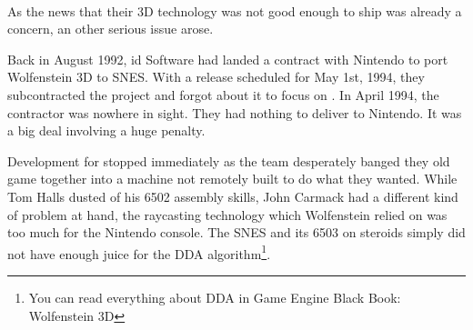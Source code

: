 \\
\par
{}%
\label{HUD_screenshot}
\par
As the news that their 3D technology was not good enough to ship was already a concern, an other serious issue arose.\\
\par
Back in August 1992, id Software had landed a contract with Nintendo to port Wolfenstein 3D to SNES. With a release scheduled for May 1st, 1994, they subcontracted the project and forgot about it to focus on \doom. In April 1994, the contractor was nowhere in sight. They had nothing to deliver to Nintendo. It was a big deal involving a huge penalty.\\
\par
 Development for \doom{}stopped immediately as the team desperately banged they old game together into a machine not remotely built to do what they wanted. While Tom Halls dusted of his 6502 assembly skills, John Carmack had a different kind of problem at hand, the raycasting technology which Wolfenstein relied on was too much for the Nintendo console. The SNES and its 6503 on steroids simply did not have enough juice for the DDA algorithm\footnote{You can read everything about DDA in Game Engine Black Book: Wolfenstein 3D}.\\%
\par



